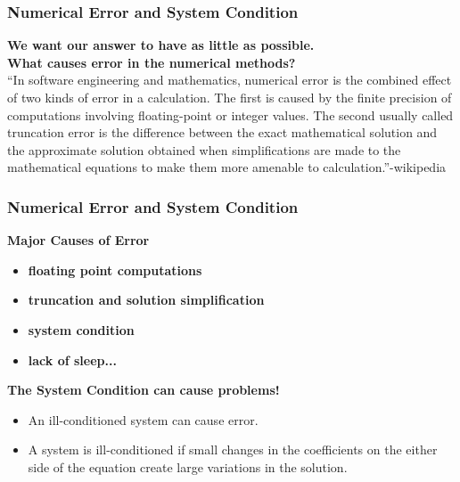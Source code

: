 \documentclass[fleqn]{beamer} %
\newcommand{\sectionIIIsubsectionIVtitle}{Numerical Error and System Condition}
\begin{document}
			\begin{frame}
				\frametitle{\sectionIIIsubsectionIVtitle}
				\bigskip

				\textbf{We want our answer to have as little  as possible.} \vspace{3mm}\\

				\textbf{What causes error in the numerical methods?} \\
				``In software engineering and mathematics, numerical error is the combined effect of two kinds of error in a calculation. The first is caused by the finite precision of computations involving floating-point or integer values. The second usually called truncation error is the difference between the exact mathematical solution and the approximate solution obtained when simplifications are made to the mathematical equations to make them more amenable to calculation.''-wikipedia\\

				\btVFill
			\end{frame}	

			\begin{frame}
				\frametitle{\sectionIIIsubsectionIVtitle} \small
				\bigskip

				\textbf{Major Causes of Error} \\
				\begin{itemize}
					\item \textbf{floating point computations} \vspace{3mm}\\
					\item \textbf{truncation and solution simplification} \vspace{3mm}\\
					\item \textbf{system condition} \vspace{3mm}\\
					\item \textbf{lack of sleep...} \vspace{3mm}\\
				\end{itemize}
				
				\textbf{ The {\BL System Condition} can cause problems!} \\
				\begin{itemize}
				\item An {\PR ill-conditioned} system can cause error. \\
				\item A system is {\PR ill-conditioned} if small changes in the coefficients on the either side of the equation create large variations in the solution.\\
				\end{itemize}

				\btVFill
			\end{frame}	
\end{document}
